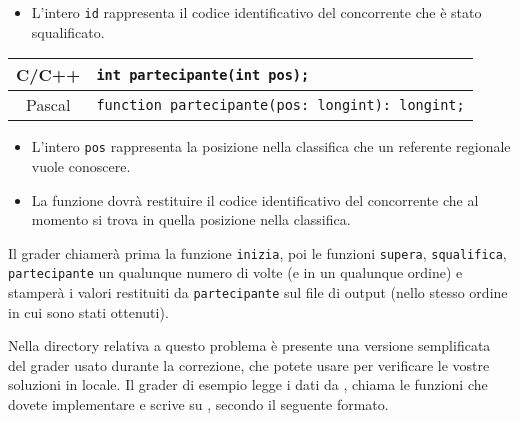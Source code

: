 \begin{itemize}[nolistsep]
  \item L'intero \texttt{id} rappresenta il codice identificativo del concorrente che è stato squalificato.
\end{itemize}

\medskip

\begin{center}\begin{tabularx}{\textwidth}{|c|X|}
\hline
C/C++  & \verb|int partecipante(int pos);|\\
\hline
Pascal  & \verb|function partecipante(pos: longint): longint;|\\
\hline
\end{tabularx}\end{center}

\begin{itemize}[nolistsep]
  \item L'intero \texttt{pos} rappresenta la posizione nella classifica che un referente regionale vuole conoscere.
  \item La funzione dovrà restituire il codice identificativo del concorrente che al momento si trova in quella posizione nella classifica.
\end{itemize}

\medskip

Il grader chiamerà prima la funzione \texttt{inizia}, poi le funzioni \texttt{supera}, \texttt{squalifica}, \texttt{partecipante} un qualunque numero di volte (e in un qualunque ordine) e stamperà i valori restituiti da \texttt{partecipante} sul file di output (nello stesso ordine in cui sono stati ottenuti).



\Grader
Nella directory relativa a questo problema è presente una versione semplificata del grader usato durante la correzione, che potete usare per verificare le vostre soluzioni in locale. Il grader di esempio legge i dati da , chiama le funzioni che dovete implementare e scrive su \outputfile{}, secondo il seguente formato.

